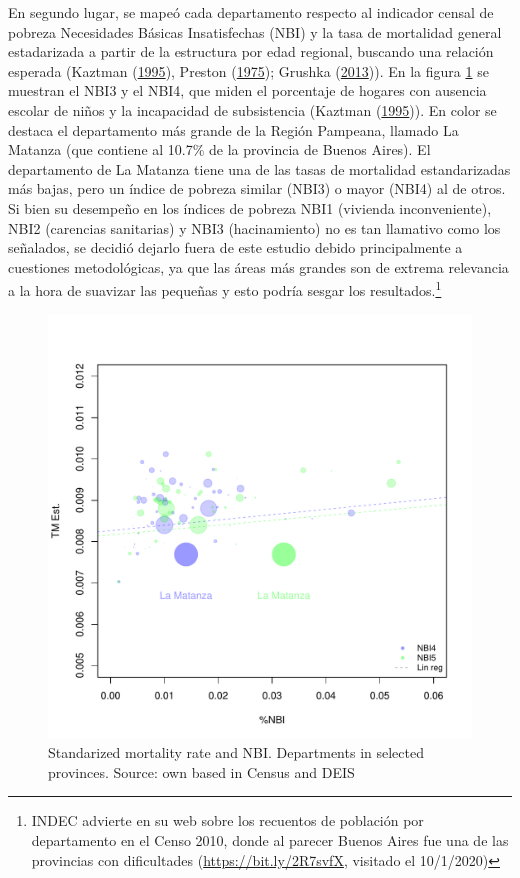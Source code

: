 \documentclass[12pt,]{article}
\begin{document}
En segundo lugar, se mapeó cada departamento respecto al indicador
censal de pobreza Necesidades Básicas Insatisfechas (NBI) y la tasa de
mortalidad general estadarizada a partir de la estructura por edad
regional, buscando una relación esperada (Kaztman
(\protect\hyperlink{ref-Kaztman1995}{1995}), Preston
(\protect\hyperlink{ref-Preston_1975}{1975}); Grushka
(\protect\hyperlink{ref-Grushka2013}{2013})). En la figura \ref{fig:NBI}
se muestran el NBI3 y el NBI4, que miden el porcentaje de hogares con
ausencia escolar de niños y la incapacidad de subsistencia (Kaztman
(\protect\hyperlink{ref-Kaztman1995}{1995})). En color se destaca el
departamento más grande de la Región Pampeana, llamado La Matanza (que
contiene al 10.7\% de la provincia de Buenos Aires). El departamento de
La Matanza tiene una de las tasas de mortalidad estandarizadas más
bajas, pero un índice de pobreza similar (NBI3) o mayor (NBI4) al de
otros. Si bien su desempeño en los índices de pobreza NBI1 (vivienda
inconveniente), NBI2 (carencias sanitarias) y NBI3 (hacinamiento) no es
tan llamativo como los señalados, se decidió dejarlo fuera de este
estudio debido principalmente a cuestiones metodológicas, ya que las
áreas más grandes son de extrema relevancia a la hora de suavizar las
pequeñas y esto podría sesgar los resultados.\footnote{INDEC advierte en
  su web sobre los recuentos de población por departamento en el Censo
  2010, donde al parecer Buenos Aires fue una de las provincias con
  dificultades (\url{https://bit.ly/2R7svfX}, visitado el 10/1/2020)}

\begin{figure}

{\centering \includegraphics[width=0.7\linewidth]{plots/ChekNBI} 

}

\caption{Standarized mortality rate and NBI. Departments in selected provinces. Source: own based in Census and DEIS}\label{fig:NBI}
\end{figure}
\end{document}
